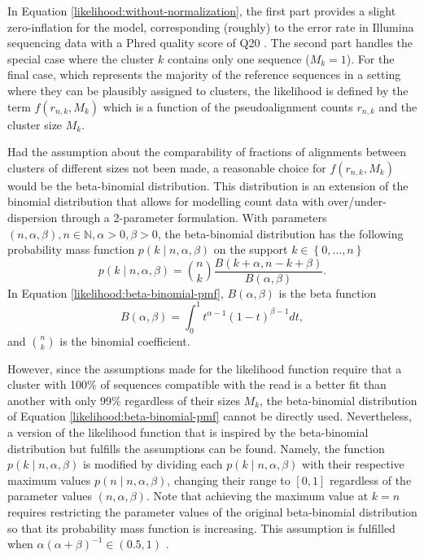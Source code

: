\documentclass[officiallayout]{tktla}
\begin{document}
In Equation \ref{likelihood:without-normalization}, the first part
provides a slight zero-inflation for the model, corresponding
(roughly) to the error rate in Illumina sequencing data with a Phred
quality score of Q20 \citep{ewing1998baseone, ewing1998basetwo}. The
second part handles the special case where the cluster $k$ contains
only one sequence ($M_{k} = 1$). For the final case, which represents
the majority of the reference sequences in a setting where they can be
plausibly assigned to clusters, the likelihood is defined by
the term $f\left(r_{n, k}, M_{k}\right)$ which is a function of the
pseudoalignment counts $r_{n, k}$ and the cluster size $M_{k}$.

Had the assumption about the comparability of fractions of
alignments between clusters of different sizes not been made, a reasonable choice
for $f\left(r_{n, k}, M_{k}\right)$ would be the beta-binomial
distribution. This distribution is an extension of the binomial
distribution that allows for modelling count data with
over/under-dispersion through a 2-parameter formulation. With
parameters $\left(n, \alpha, \beta\right), n \in \mathbb{N}, \alpha >
0, \beta > 0$, the beta-binomial distribution has the following
probability mass function $p\left(k \middle| n, \alpha, \beta\right)$
on the support $k \in \left\{0, \dots, n\right\}$
\begin{equation}
  \label{likelihood:beta-binomial-pmf}
  p\left(k \middle| n, \alpha, \beta\right) = \binom{n}{k}\frac{B\left(k + \alpha, n - k + \beta\right)}{B\left(\alpha, \beta\right)}.
\end{equation}
In Equation \ref{likelihood:beta-binomial-pmf}, $B\left(\alpha, \beta\right)$ is the beta function
\begin{equation}
  \label{likelihood:beta-function}
  B\left(\alpha, \beta\right) = \int_{0}^{1}t^{\alpha - 1}\left(1 - t\right)^{\beta - 1}dt,
\end{equation}
and $\binom{n}{k}$ is the binomial coefficient.

However, since the assumptions made for the likelihood function
require that a cluster with 100\% of sequences compatible with the
read is a better fit than another with only 99\% regardless of their
sizes $M_{k}$, the beta-binomial distribution of Equation
\ref{likelihood:beta-binomial-pmf} cannot be directly
used. Nevertheless, a version of the likelihood function that is
inspired by the beta-binomial distribution but fulfills the
assumptions can be found. Namely, the function $p\left(k \middle| n,
\alpha, \beta\right)$ is modified by dividing each $p\left(k \middle|
n, \alpha, \beta\right)$ with their respective maximum values
$p\left(n \middle| n, \alpha, \beta\right)$, changing their range to
$\left[0, 1\right]$ regardless of the parameter values $\left(n,
\alpha, \beta \right)$. Note that achieving the maximum value at $k =
n$ requires restricting the parameter values of the original
beta-binomial distribution so that its probability mass function is
increasing. This assumption is fulfilled when $\alpha\left(\alpha +
\beta\right)^{-1} \in \left(0.5, 1\right)$ \citep{berg1993condorcet}.
\end{document}
